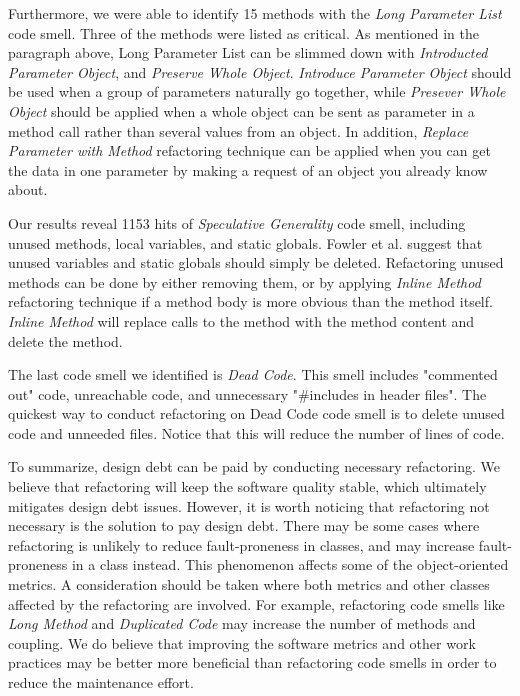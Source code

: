Furthermore, we were able to identify 15 methods with the \textit{Long Parameter List} code smell. Three of the methods were listed as critical. As mentioned in the paragraph above, Long Parameter List can be slimmed down with \textit{Introducted Parameter Object}, and \textit{Preserve Whole Object}. \textit{Introduce Parameter Object} should be used when a group of parameters naturally go together, while \textit{Presever Whole Object} should be applied when a whole object can be sent as parameter in a method call rather than several values from an object. In addition, \textit{Replace Parameter with Method} refactoring technique can be applied when you can get the data in one parameter by making a request of an object you already know about\cite{fowler1999refactoring}.

Our results reveal 1153 hits of \textit{Speculative Generality} code smell, including unused methods, local variables, and static globals. Fowler et al.\cite{fowler1999refactoring} suggest that unused variables and static globals should simply be deleted. Refactoring unused methods can be done by either removing them, or by applying \textit{Inline Method} refactoring technique if a method body is more obvious than the method itself. \textit{Inline Method} will replace calls to the method with the method content and delete the method.

The last code smell we identified is \textit{Dead Code}. This smell includes "commented out" code, unreachable code, and unnecessary "\#includes in header files". The quickest way to conduct refactoring on Dead Code code smell is to delete unused code and unneeded files. Notice that this will reduce the number of lines of code.

To summarize, design debt can be paid by conducting necessary refactoring. We believe that refactoring will keep the software quality stable, which ultimately mitigates design debt issues. However, it is worth noticing that refactoring not necessary is the solution to pay design debt. There may be some cases where refactoring is unlikely to reduce fault-proneness in classes, and may increase fault-proneness in a class instead\cite{hall2014some}. This phenomenon affects some of the object-oriented metrics. A consideration should be taken where both metrics and other classes affected by the refactoring are involved. For example, refactoring code smells like \textit{Long Method} and \textit{Duplicated Code} may increase the number of methods and coupling. We do believe that improving the software metrics and other work practices may be better more beneficial than refactoring code smells in order to reduce the maintenance effort.

